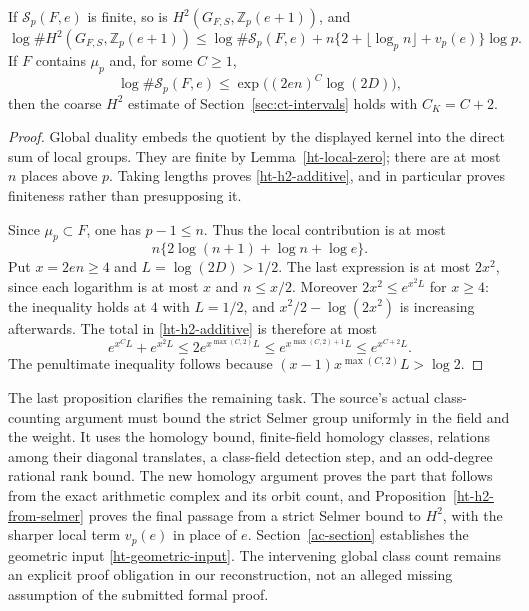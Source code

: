\begin{proposition}\label{ht-h2-from-selmer}
If $\mathcal S_p(F,e)$ is finite, so is
$H^2(G_{F,S},\mathbb Z_p(e+1))$, and
\begin{equation}\label{ht-h2-additive}
 \log\#H^2(G_{F,S},\mathbb Z_p(e+1))
 \le\log\#\mathcal S_p(F,e)
       +n\{2+\lfloor\log_p n\rfloor+v_p(e)\}\log p.
\end{equation}
If $F$ contains $\mu_p$ and, for some $C\ge1$,
\[
 \log\#\mathcal S_p(F,e)
       \le\exp\bigl((2en)^C\log(2D)\bigr),
\]
then the coarse $H^2$ estimate of Section~\ref{sec:ct-intervals}
holds with $C_K=C+2$.
\end{proposition}
\begin{proof}
Global duality embeds the quotient by the displayed kernel
into the direct sum of local groups.  They are finite by
Lemma~\ref{ht-local-zero}; there are at most $n$ places above
$p$.  Taking lengths proves \eqref{ht-h2-additive}, and in
particular proves finiteness rather than presupposing it.

Since $\mu_p\subset F$, one has $p-1\le n$.
Thus the local contribution is at most
\[
 n\{2\log(n+1)+\log n+\log e\}.
\]
Put $x=2en\ge4$ and $L=\log(2D)>1/2$.  The last expression
is at most $2x^2$, since each logarithm is at most $x$ and
$n\le x/2$.  Moreover $2x^2\le e^{x^2L}$ for $x\ge4$:
the inequality holds at $4$ with $L=1/2$, and
$x^2/2-\log(2x^2)$ is increasing afterwards.
The total in \eqref{ht-h2-additive} is therefore at most
\[
 e^{x^CL}+e^{x^2L}
 \le2e^{x^{\max(C,2)}L}
 \le e^{x^{\max(C,2)+1}L}
 \le e^{x^{C+2}L}.
\]
The penultimate inequality follows because
$(x-1)x^{\max(C,2)}L>\log2$.
\end{proof}

The last proposition clarifies the remaining task.
The source's actual class-counting argument must bound the
strict Selmer group uniformly in the field and the weight.
It uses the homology bound, finite-field homology classes,
relations among their diagonal translates, a class-field
detection step, and an odd-degree rational rank bound.
The new homology argument proves the part that follows from
the exact arithmetic complex and its orbit count, and
Proposition~\ref{ht-h2-from-selmer} proves the final passage
from a strict Selmer bound to $H^2$, with the sharper local
term $v_p(e)$ in place of $e$. Section~\ref{ac-section}
establishes the geometric input \eqref{ht-geometric-input}.
The intervening global class count remains an explicit proof
obligation in our reconstruction, not an alleged missing
assumption of the submitted formal proof.


